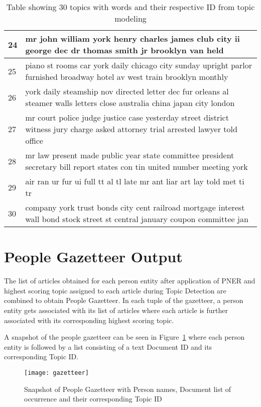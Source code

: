 \begin{table}
{\begin{tabular}{|p{1cm}|p{16cm}|}
    24       & mr john william york henry charles james club city ii george dec dr thomas smith jr brooklyn van held                                                 \\ \hline
    25       & piano st rooms car york daily chicago city sunday upright parlor furnished broadway hotel av west train brooklyn monthly                              \\ \hline
    26       & york daily steamship nov directed letter dec fur orleans al steamer walls letters close australia china japan city london                             \\ \hline
    27       & mr court police judge justice case yesterday street district witness jury charge asked attorney trial arrested lawyer told office                     \\ \hline
    28       & mr law present made public year state committee president secretary bill report states con tin united number meeting york                             \\ \hline
    29       & air ran ur fur ui full tt al tl late mr ant liar art lay told met ti tr                                                                               \\ \hline
    30       & company york trust bonds city cent railroad mortgage interest wall bond stock street st central january coupon committee jan                          \\ \hline
    \end{tabular}}
\caption{Table showing 30 topics with words and their respective ID from topic modeling}
\label{table:topicwords}
\end{table}

\newpage
\section{People Gazetteer Output }
\label{gaz:result}

The list of articles obtained for each person entity after application of PNER and highest scoring topic assigned to each article during Topic Detection are combined to obtain People Gazetteer. In each tuple of the gazetteer, a person entity gets associated with its list of articles where each article is further associated with its corresponding highest scoring topic.

A snapshot of the people gazetteer can be seen in Figure~\ref{figure:gazette} where each person entity is followed by a list consisting of a text Document ID and its corresponding Topic ID. 
\begin{figure}[!h]
\centering
\texttt{[image: gazetteer]}
\caption{Snapshot of People Gazetteer with Person names, Document list of occurrence and their corresponding Topic ID}
\label{figure:gazette}
\end{figure} 


